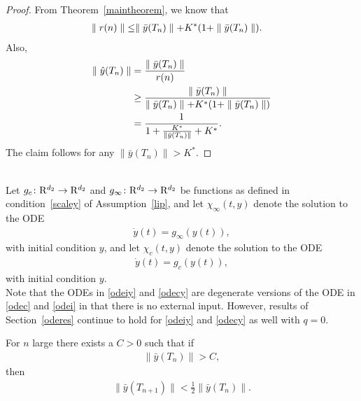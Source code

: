 \begin{proof}
From Theorem~\ref{maintheorem}, we know that
\begin{align}
\parallel r(n)\parallel &\leq \parallel \bar{y}(T_n)\parallel +K^*(1+\parallel \bar{y}(T_n)\parallel).\nonumber
\end{align}
Also,
\begin{align}
\parallel \hat{y}(T_n)\parallel &=\frac{\parallel \bar{y}(T_n)\parallel }{r(n)}\nonumber\\
		    &\geq\frac{\parallel \bar{y}(T_n)\parallel}{\parallel\bar{y}(T_n)
\parallel +K^*(1+\parallel \bar{y}(T_n)\parallel)}\nonumber\\
		    &=\frac{1}{1+\frac{K^*}{\parallel \bar{y}(T_n)\parallel}+K^*}.\label{choicey}		    	
\end{align}
The claim follows for any $\parallel \bar{y}(T_n)\parallel >K^*$.
\end{proof}\\
Let $g_c\colon \mathrm{R}^{d_2} \rightarrow \mathrm{R}^{d_2}$ and $g_\infty \colon \mathrm{R}^{d_2} \rightarrow \mathrm{R}^{d_2}$ be functions as defined in 
condition~\ref{scaley} of Assumption~\ref{lip}, and let $\chi_\infty(t,y)$ denote the solution to the ODE
\begin{align}\label{odeiy}
\dot{y}(t)=g_\infty(y(t)),
\end{align} 
with initial condition $y$, and let $\chi_c(t,y)$ denote the solution to the ODE
\begin{align}\label{odecy}
\dot{y}(t)=g_c(y(t)),
\end{align} 
with initial condition $y$.\\
Note that the ODEs in \eqref{odeiy} and \eqref{odecy} are degenerate versions of the ODE in \eqref{odec} and \eqref{odei} in that there is no external input. However, results of Section~\ref{oderes} continue to hold for \eqref{odeiy} and \eqref{odecy} as well with $q=0$.
\begin{lemma}\label{lemmtslow}
For $n$ large there exists a $C>0$ such that if
\begin{align}\label{ygreat}
\parallel \bar{y}(T_n)\parallel >C,
\end{align}
 then 
\begin{align}
\parallel \bar{y}(T_{n+1})\parallel < \frac{1}{2}\parallel \bar{y}(T_{n})\parallel.
\end{align}
\end{lemma}
